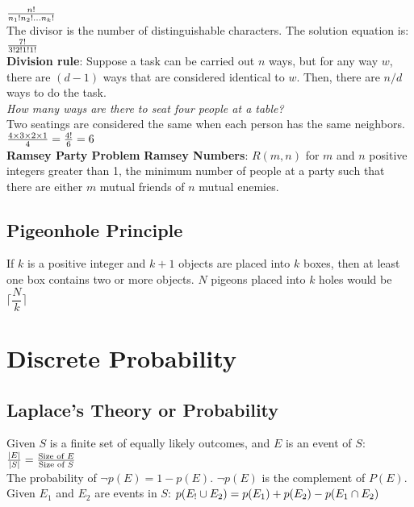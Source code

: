\documentclass[letter]{article}
\begin{document}
\begin{multicols}{2}
  $\\\frac{n!}{n_1!n_2! \ldots n_k!}$\\
  The divisor is the number of distinguishable characters. The solution equation
  is:
  $\\\frac{7!}{3!2!1!1!}$\\
  \textbf{Division rule}: Suppose a task can be carried out $n$ ways, but for
  any way $w$, there are $(d - 1)$ ways that are considered identical to $w$.
  Then, there are $n/d$ ways to do the task. \\
  \textit{How many ways are there to seat four people at a table?} \\
  Two seatings are considered the same when each person has the same neighbors.
  $\\\frac{4 \times 3 \times 2 \times 1}{4} = \frac{4!}{6} = 6$\\
  \textbf{Ramsey Party Problem}
  \textbf{Ramsey Numbers}: $R(m, n)$ for $m$ and $n$ positive integers greater
  than 1, the minimum number of people at a party such that there are either $m$
  mutual friends of $n$ mutual enemies.

  \subsection{Pigeonhole Principle} 
  If $k$ is a positive integer and $k + 1$ objects are placed into $k$ boxes,
  then at least one box contains two or more objects. $N$ pigeons placed into
  $k$ holes would be
  $\lceil\dfrac{N}{k}\rceil$

  \section{Discrete Probability} 

  \subsection{Laplace's Theory or Probability} 
  Given $S$ is a finite set of equally likely outcomes, and $E$ is an event of
  $S$:
  $\\\frac{|E|}{|S|} = \frac{\text{Size of } E}{\text{Size of } S}$\\
  The probability of $\neg p(E) = 1 - p(E)$. $\neg p(E)$ is the complement of
  $P(E)$. \\
  Given $E_1$ and $E_2$ are events in $S$:
  $\\p(E_! \cup E_2) = p(E_1) + p(E_2) - p(E_1 \cap E_2)$


\end{multicols}
\end{document}
